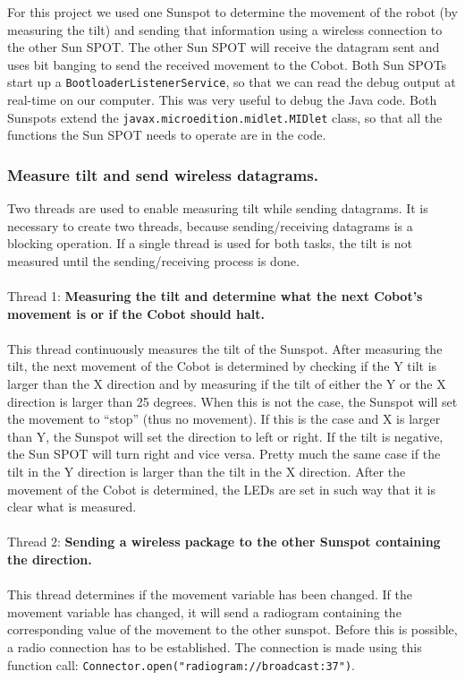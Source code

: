 \documentclass[a4paper,10pt]{article} %
\begin{document}
For this project we used one Sunspot to determine the movement of the robot (by
measuring the tilt) and sending that information using a wireless connection to
the other Sun SPOT. The other Sun SPOT will receive the datagram sent and uses
bit banging to send the received movement to the Cobot. Both Sun SPOTs start up
a \texttt{BootloaderListenerService}, so that we can read the debug output at
real-time on our computer. This was very useful to debug the Java code. Both
Sunspots extend the \texttt{javax.microedition.midlet.MIDlet} class, so that all
the functions the Sun SPOT needs to operate are in the code.

\subsubsection{Measure tilt and send wireless datagrams.} %

Two threads are used to enable measuring tilt while sending datagrams. It is
necessary to create two threads, because sending/receiving datagrams is a
blocking operation. If a single thread is used for both tasks, the tilt is not
measured until the sending/receiving process is done.
\\
\\
\noindent Thread 1: \textbf{Measuring the tilt and determine what the next Cobot's
movement is or if the Cobot should halt.}
\\
\\
This thread continuously measures the tilt of the Sunspot. After measuring the
tilt, the next movement of the Cobot is determined by checking if the Y tilt is
larger than the X direction and by measuring if the tilt of either the Y or the
X direction is larger than 25 degrees. When this is not the case, the Sunspot
will set the movement to ``stop'' (thus no movement). If this is the case and X
is larger than Y, the Sunspot will set the direction to left or right. If the
tilt is negative, the Sun SPOT will turn right and vice versa.  Pretty much the
same case if the tilt in the Y direction is larger than the tilt in the X
direction. After the movement of the Cobot is determined, the LEDs are set in
such way that it is clear what is measured.
\\
\\
\noindent Thread 2: \textbf{Sending a wireless package to the other Sunspot
containing the direction.}
\\
\\
This thread determines if the movement variable has been changed. If the
movement variable has changed, it will send a radiogram containing the
corresponding value of the movement to the other sunspot. Before this is
possible, a radio connection has to be established. The connection is made using
this function call: \texttt{Connector.open("radiogram://broadcast:37")}.
\end{document}
